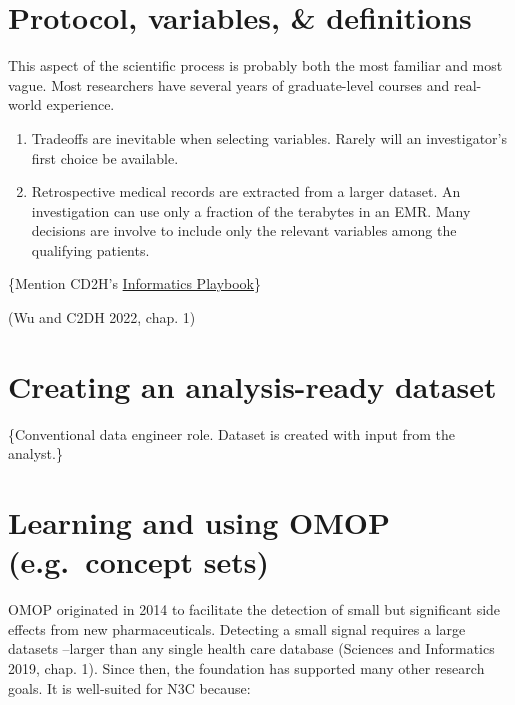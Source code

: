\documentclass[
  letterpaper,
  DIV=11,
  numbers=noendperiod]{scrreprt}
\begin{document}
\hypertarget{protocol-variables-definitions}{%
\section{Protocol, variables, \&
definitions}\label{protocol-variables-definitions}}

This aspect of the scientific process is probably both the most familiar
and most vague. Most researchers have several years of graduate-level
courses and real-world experience.

\begin{enumerate}
\def\labelenumi{\arabic{enumi}.}
\item
  Tradeoffs are inevitable when selecting variables. Rarely will an
  investigator's first choice be available.
\item
  Retrospective medical records are extracted from a larger dataset. An
  investigation can use only a fraction of the terabytes in an EMR. Many
  decisions are involve to include only the relevant variables among the
  qualifying patients.
\end{enumerate}

\{Mention CD2H's
\href{https://playbook.cd2h.org/en/latest/index.html}{Informatics
Playbook}\}

(Wu and C2DH 2022, chap. 1)

\hypertarget{creating-an-analysis-ready-dataset}{%
\section{Creating an analysis-ready
dataset}\label{creating-an-analysis-ready-dataset}}

\{Conventional data engineer role. Dataset is created with input from
the analyst.\}

\hypertarget{learning-and-using-omop-e.g.-concept-sets}{%
\section{Learning and using OMOP (e.g.~concept
sets)}\label{learning-and-using-omop-e.g.-concept-sets}}

OMOP originated in 2014 to facilitate the detection of small but
significant side effects from new pharmaceuticals. Detecting a small
signal requires a large datasets --larger than any single health care
database (Sciences and Informatics 2019, chap. 1). Since then, the
foundation has supported many other research goals. It is well-suited
for N3C because:
\end{document}
